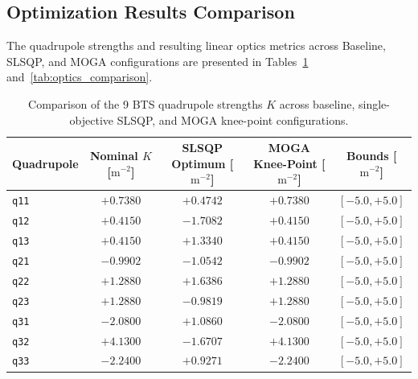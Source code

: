 \documentclass[a4paper,11pt]{article}
\begin{document}
\subsection{Optimization Results Comparison}

The quadrupole strengths and resulting linear optics metrics across Baseline, SLSQP, and MOGA configurations are presented in Tables~\ref{tab:quad_strengths} and~\ref{tab:optics_comparison}.

\begin{table}[htbp]
\centering
\caption{Comparison of the 9 BTS quadrupole strengths $K$ across baseline, single-objective SLSQP, and MOGA knee-point configurations.}
\label{tab:quad_strengths}
\begin{tabular}{lcccc}
\hline\hline
Quadrupole & Nominal $K$ [$\mathrm{m}^{-2}$] & SLSQP Optimum [$\mathrm{m}^{-2}$] & MOGA Knee-Point [$\mathrm{m}^{-2}$] & Bounds [$\mathrm{m}^{-2}$] \\
\hline
\texttt{q11} & $+0.7380$ & $+0.4742$ & $+0.7380$ & $[-5.0, +5.0]$ \\
\texttt{q12} & $+0.4150$ & $-1.7082$ & $+0.4150$ & $[-5.0, +5.0]$ \\
\texttt{q13} & $+0.4150$ & $+1.3340$ & $+0.4150$ & $[-5.0, +5.0]$ \\
\texttt{q21} & $-0.9902$ & $-1.0542$ & $-0.9902$ & $[-5.0, +5.0]$ \\
\texttt{q22} & $+1.2880$ & $+1.6386$ & $+1.2880$ & $[-5.0, +5.0]$ \\
\texttt{q23} & $+1.2880$ & $-0.9819$ & $+1.2880$ & $[-5.0, +5.0]$ \\
\texttt{q31} & $-2.0800$ & $+1.0860$ & $-2.0800$ & $[-5.0, +5.0]$ \\
\texttt{q32} & $+4.1300$ & $-1.6707$ & $+4.1300$ & $[-5.0, +5.0]$ \\
\texttt{q33} & $-2.2400$ & $+0.9271$ & $-2.2400$ & $[-5.0, +5.0]$ \\
\hline\hline
\end{tabular}
\end{table}
\end{document}
